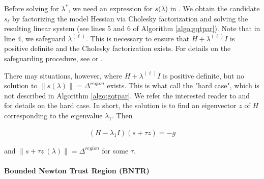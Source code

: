 \noindent Before solving for $\lambda^*$, we need an expression for $s(\lambda$) in \label{eq:boundary-solution}. We obtain the candidate $s_\ell$ by factorizing the model Hessian via Cholesky factorization and solving the resulting linear system (see lines 5 and 6 of Algorithm \ref{algo:gqtpar}). Note that in line 4, we safeguard $\lambda^{(\ell)}$. This is necessary to ensure that $H + \lambda^{(\ell)} I$ is positive definite and the Cholesky factorization exists. For details on the safeguarding procedure, see \cite{More1983} or \cite{Nocedal2006}.


\noindent There may situations, however, where $H + \lambda^{(\ell)} I$ is positive definite, but no solution to $ \lVert s (\lambda)  \rVert = \Delta^{region} $ exists. This is what \cite{More1983} call the "hard case", which is not described in Algorithm \ref{algo:gqtpar}. We refer the interested reader to \cite{More1983} and \cite{Conn2000} for details on the hard case. In short, the solution is to find an eigenvector $z$ of $H$ corresponding to the eigenvalue $\lambda_1$. Then

\begin{align}
    \left(H-\lambda_1 I\right)(s+\tau z)=-g
    \label{eq:hard-case}
\end{align}

\noindent and $ \lVert s +\tau z \ (\lambda) \rVert  = \Delta^{region}  $ for some $\tau$.





\paragraph{Bounded Newton Trust Region (BNTR)}




